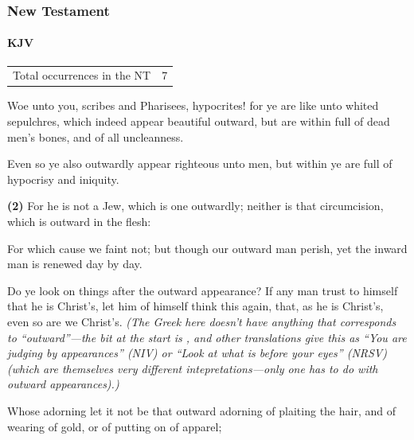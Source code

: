 		
		
	\subsubsection{New Testament} %
		\label{OUTWARD-NT}
	
		\paragraph{KJV}
			\label{OUTWARD-NT-KJV}
			
	
			\begin{tabular}{ll}
				Total occurrences in the NT & 7
			\end{tabular}
			
			\begin{compactdesc}
				\item[Matthew 23:27] Woe unto you, scribes and Pharisees, hypocrites!  for ye are like unto whited sepulchres, which indeed appear beautiful outward, but are within full of dead men's bones, and of all uncleanness.
				\item[Matthew 23:28] Even so ye also outwardly appear righteous unto men, but within ye are full of hypocrisy and iniquity.
				\item[Romans 2:28] \textbf{(2)} For he is not a Jew, which is one outwardly; neither is that circumcision, which is outward in the flesh:
				\item[2 Corinthians 4:16] For which cause we faint not; but though our outward man perish, yet the inward man is renewed day by day.
				\item[2 Corinthians 10:7] Do ye look on things after the outward appearance?  If any man trust to himself that he is Christ's, let him of himself think this again, that, as he is Christ's, even so are we Christ's. \textit{(The Greek here doesn't have anything that corresponds to ``outward''---the bit at the start is , and other translations give this as ``You are judging by appearances'' (NIV) or ``Look at what is before your eyes'' (NRSV) (which are themselves very different intepretations---only one has to do with outward appearances).)}
				\item[1 Peter 3:3] Whose adorning let it not be that outward adorning of plaiting the hair, and of wearing of gold, or of putting on of apparel;
			\end{compactdesc}
			
